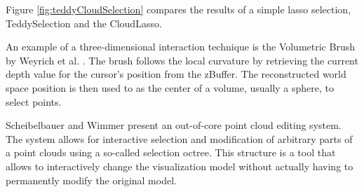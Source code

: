 Figure \ref{fig:teddyCloudSelection} compares the results of a simple lasso selection, TeddySelection and the CloudLasso. 

\par

An example of a three-dimensional interaction technique is the Volumetric Brush by Weyrich et al. \cite{weyrich2004post}. The brush follows the local curvature by retrieving the current depth value for the cursor's position from the zBuffer. The reconstructed world space position is then used to as the center of a volume, usually a sphere, to select points. 

\par

Scheibelbauer and Wimmer \cite{scheiblauer2011out} present an out-of-core point cloud editing system. The system allows for interactive selection and modification of arbitrary parts of a point clouds using a so-called selection octree. This structure is a tool that allows to interactively change the visualization model without actually having to permanently modify the original model. 
